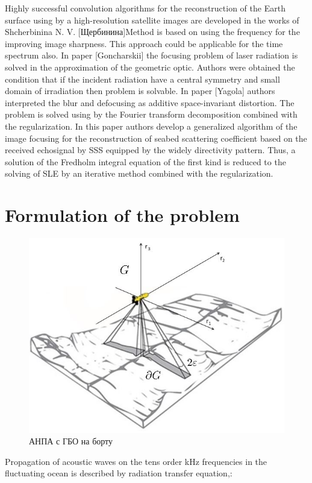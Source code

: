\documentclass{procDDs}
\begin{document}
Highly successful convolution algorithms for the reconstruction of  the Earth surface  using by a high-resolution satellite images are developed in the works of Shcherbinina N. V.  [Щербинина]Method is based on using the frequency for the improving image sharpness. This approach could be applicable for the time spectrum also.  
In paper [Goncharskii] the focusing problem of laser radiation is solved in the approximation of the geometric optic. Authors were obtained the condition that if the incident radiation have a central symmetry and small domain of irradiation then problem is solvable.
In paper [Yagola] authors interpreted the blur and defocusing as additive space-invariant distortion. The problem is solved using by the Fourier transform decomposition combined with the regularization.
In this paper authors develop a generalized algorithm of the image focusing for the reconstruction of seabed scattering coefficient based on the received echosignal by SSS equipped by the widely directivity pattern. Thus, a solution of the Fredholm integral equation of the first kind is reduced to the solving of SLE by an iterative method combined with the regularization.

\section{Formulation of the problem}
\begin{figure}[h!]\center
	
	\includegraphics[width=1\linewidth]{img/gbo.jpg}
	\caption{АНПА с ГБО на борту}
	\label{ris:gbo}
\end{figure}
Propagation of acoustic waves on the tens order kHz frequencies in the fluctuating ocean is described by radiation
transfer equation\cite{p11},\cite{p12}:
\end{document}
